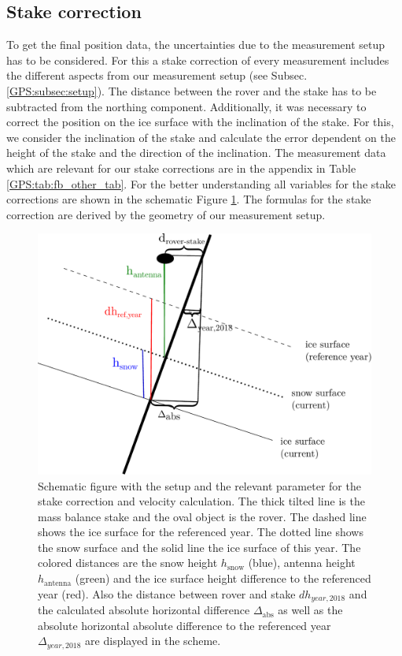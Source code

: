 \subsection{Stake correction}
To get the final position data, the uncertainties due to the measurement setup has to be considered.
For this a stake correction of every measurement includes the different aspects from our measurement setup (see Subsec. \ref{GPS:subsec:setup}).
The distance between the rover and the stake has to be subtracted from the northing component.
Additionally, it was necessary to correct the position on the ice surface with the inclination of the stake. 
For this, we consider the inclination of the stake and calculate the error dependent on the height of the stake and the direction of the inclination.
The measurement data which are relevant for our stake corrections are in the appendix in Table \ref{GPS:tab:fb_other_tab}.
For the better understanding all variables for the stake corrections are shown in the schematic Figure \ref{GPS:fig:scheme}.
The formulas for the stake correction are derived by the geometry of our measurement setup.

\begin{figure}[h]
	\centering
	\includegraphics[width=0.7\linewidth]{./figs/pictures/schematic_setup.pdf}
	\caption{Schematic figure with the setup and the relevant parameter for the stake correction and velocity calculation. The thick tilted line is the mass balance stake and the oval object is the rover. The dashed line shows the ice surface for the referenced year. The dotted line shows the snow surface and the solid line the ice surface of this year. The colored distances are the snow height $h_{\text{snow}}$ (blue), antenna height $h_{\text{antenna}}$ (green) and the ice surface height difference to the referenced year (red). Also the distance between rover and stake $dh_{year,2018}$ and the calculated absolute horizontal difference $\Delta_{\text{abs}}$ as well as the absolute horizontal absolute difference to the referenced year $\Delta_{year,2018}$ are displayed in the scheme.}
	\label{GPS:fig:scheme}
\end{figure}

